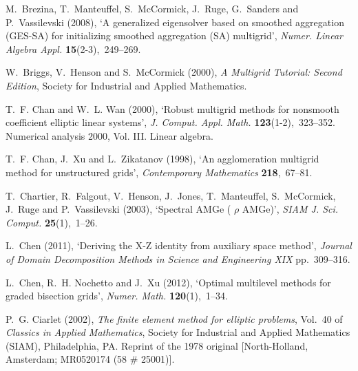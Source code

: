 \documentclass[12pt]{acta_2011xz}
\begin{document}
\begin{thebibliography}{xx}
M.~Brezina, T.~Manteuffel, S.~McCormick, J.~Ruge, G.~Sanders and P.~Vassilevski
   (2008), `A generalized eigensolver based on smoothed aggregation
  ({GES}-{SA}) for initializing smoothed aggregation ({SA}) multigrid', {\em
  Numer. Linear Algebra Appl.} {\bf 15}(2-3),~249--269.

W.~Briggs, V.~Henson and S.~McCormick  (2000), {\em A Multigrid Tutorial:
  Second Edition}, Society for Industrial and Applied Mathematics.

T.~F. Chan and W.~L. Wan  (2000), `Robust multigrid methods for nonsmooth
  coefficient elliptic linear systems', {\em J. Comput. Appl. Math.} {\bf
  123}(1-2),~323--352.
\newblock Numerical analysis 2000, Vol. III. Linear algebra.

T.~F. Chan, J.~Xu and L.~Zikatanov  (1998), `An agglomeration multigrid method
  for unstructured grids', {\em Contemporary Mathematics} {\bf 218},~67--81.

T.~Chartier, R.~Falgout, V.~Henson, J.~Jones, T.~Manteuffel, S.~McCormick,
  J.~Ruge and P.~Vassilevski  (2003), `Spectral {AMG}e ({        $\rho$        }{AMG}e)', {\em
  SIAM J. Sci. Comput.} {\bf 25}(1),~1--26.

L.~Chen  (2011), `Deriving the {X-Z} identity from auxiliary space method',
  {\em Journal of Domain Decomposition Methods in Science and Engineering XIX}
  pp.~309--316.

L.~Chen, R.~H. Nochetto and J.~Xu  (2012), `Optimal multilevel methods for
  graded bisection grids', {\em Numer. Math.} {\bf 120}(1),~1--34.

P.~G. Ciarlet  (2002), {\em The finite element method for elliptic problems},
  Vol.~40 of {\em Classics in Applied Mathematics}, Society for Industrial and
  Applied Mathematics (SIAM), Philadelphia, PA.
\newblock Reprint of the 1978 original [North-Holland, Amsterdam; MR0520174 (58
   \# 25001)].


\end{thebibliography}
\end{document}
